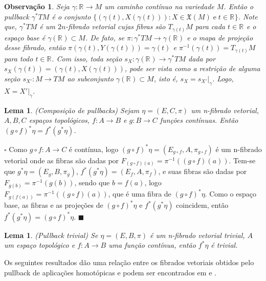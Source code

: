 \documentclass[12pt]{book}
\newtheorem{lema}[teorema]{Lema}
\newtheorem{observacao}[teorema]{Observação}
\newenvironment{prova}[1]{$\square$ #1}{\hfill$\blacksquare$}
\newcommand{\campossuaves}[1]{\mathfrak{X}(#1)}
\newcommand{\espacotangenteponto}[2]{T_{#1}#2}
\newcommand{\pullbackfibradotangente}[2]{#1^{*}T#2}
\newcommand{\pullbackfibradotangenteM}[1]{\pullbackfibradotangente{#1}{M}}
\newcommand{\real}[1]{\mathbb{R}^{#1}}
\newcommand{\reta}{\real{}}
\begin{document}
	\begin{observacao}\label{observacao_pullback_fibrado_tangente}
		Seja $\gamma:\reta \to M$ um caminho contínuo na variedade $M$. Então o pullback $\pullbackfibradotangenteM{\gamma}$ é o conjunto $\{(\gamma(t), X(\gamma(t))): X\in \campossuaves{M} \; \text{e}\; t \in \reta \}$. Note que, $\pullbackfibradotangenteM{\gamma}$ é um $2n$-fibrado vetorial cujas fibras são $\espacotangenteponto{\gamma(t)}{M}$ para cada $t\in \reta$ e o espaço base é $\gamma(\reta)\subset M$. De fato, se $\pi: \pullbackfibradotangenteM{\gamma} \to \gamma(\reta)$ e o mapa de projeção desse fibrado, então $\pi(\gamma(t), Y(\gamma(t))) = \gamma(t)$ e $\pi^{-1}(\gamma(t)) = \espacotangenteponto{\gamma(t)}{M}$ para todo $t\in \reta$. Com isso, toda seção $s_{X}: \gamma(\reta)\to \pullbackfibradotangenteM{\gamma}$ dada por $s_{X}(\gamma(t)) = (\gamma(t), X(\gamma(t)))$, pode ser vista como a restrição de alguma seção $s_{X'}: M\to TM$ ao subconjunto $\gamma(\reta) \subset M$, isto é, $s_{X}= s_{X'}|_{\gamma}$. Logo, $X=X'|_{\gamma}$.
	\end{observacao}
	
	\begin{lema}\label{pullback_composicao}
		(Composição de pullbacks) Sejam $\eta =(E, C, \pi)$ um n-fibrado vetorial, $A, B, C$ espaços topológicos, $f:A\to B$ e $g:B\to C$ funções contínuas. Então $(g\circ f)^{*} \eta= f^{*}(g^{*}\eta)$.
	\end{lema}
	\begin{prova}
		Como $g\circ f:A\to C$ é contínua, logo $(g\circ f)^{*}\eta = (E_{g\circ f}, A, \pi_{g\circ f})$ é um n-fibrado vetorial onde as fibras são dadas por $F_{(g\circ f)(a)} = \pi^{-1}((g\circ f)(a))$. Tem-se que $g^{*}\eta=(E_{g}, B, \pi_{g})$, $f^{*}(g^{*}\eta) = (E_{f}, A, \pi_{f})$, e suas fibras são dadas por $F_{g(b)} = \pi^{-1}(g(b))$, sendo que $b=f(a)$, logo  $F_{g(f(a))} = \pi^{-1}((g \circ f)(a))$, que é uma fibra de $(g\circ f)^{*}\eta$. Como o espaço base, as fibras e as projeções de $(g\circ f)^{*}\eta$ e $f^{*}(g^{*}\eta)$ coincidem, então $f^{*}(g^{*}\eta) = (g\circ f)^{*}\eta$.
	\end{prova}
	\begin{lema}\label{pullback_trivial}
		(Pullback trivial) Se $\eta = (E, B, \pi)$ é um n-fibrado vetorial trivial, $A$ um espaço topológico e $f:A\to B$ uma função contínua, então $f^{*}\eta$ é trivial.
	\end{lema}
	
	Os seguintes resultados dão uma relação entre os fibrados vetoriais obtidos pelo pullback de aplicações homotópicas e podem ser encontrados em \cite{nakahara} e \cite{steenrod_fibre_bundles}.
	
\end{document}
